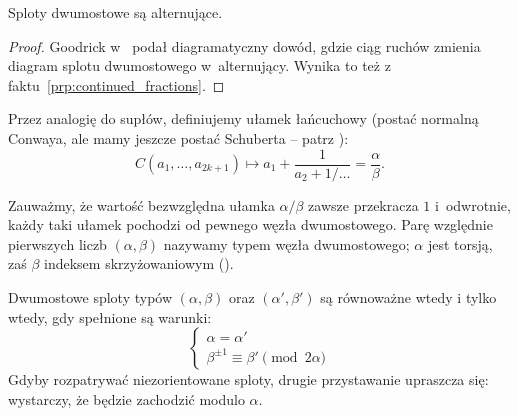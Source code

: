 
\begin{proposition}
    Sploty dwumostowe są alternujące.
\end{proposition}

\begin{proof}
    Goodrick w~\cite{goodrick1972} podał diagramatyczny dowód, gdzie ciąg ruchów zmienia diagram splotu dwumostowego w~alternujący.
    Wynika to też z faktu~\ref{prp:continued_fractions}.
\end{proof}

%
%
%
Przez analogię do supłów, definiujemy ułamek łańcuchowy (postać normalną Conwaya, ale mamy jeszcze postać Schuberta -- patrz \cite[s. 21]{kawauchi1996}):
\begin{equation}
    C(a_1, \ldots, a_{2k+1}) \mapsto a_1 + \frac{1}{a_2 + 1/\ldots} = \frac \alpha \beta.
\end{equation}

Zauważmy, że wartość bezwzględna ułamka $\alpha/\beta$ zawsze przekracza $1$ i~odwrotnie, każdy taki ułamek pochodzi od pewnego węzła dwumostowego.
Parę względnie pierwszych liczb $(\alpha, \beta)$ nazywamy typem węzła dwumostowego; $\alpha$ jest torsją, zaś $\beta$ indeksem skrzyżowaniowym (\cite[s. 210]{burde2014}).

\begin{proposition}
    \label{prp:tangle_equivalence}
    Dwumostowe sploty typów $(\alpha, \beta)$ oraz $(\alpha', \beta')$ są równoważne wtedy i tylko wtedy, gdy spełnione są warunki:
    \begin{equation}
        \begin{cases}
            \alpha = \alpha' \\
            \beta^{\pm 1} \equiv \beta' \pmod {2 \alpha}
        \end{cases}
    \end{equation}
    Gdyby rozpatrywać niezorientowane sploty, drugie przystawanie upraszcza się: wystarczy, że będzie zachodzić modulo $\alpha$.
\end{proposition}

